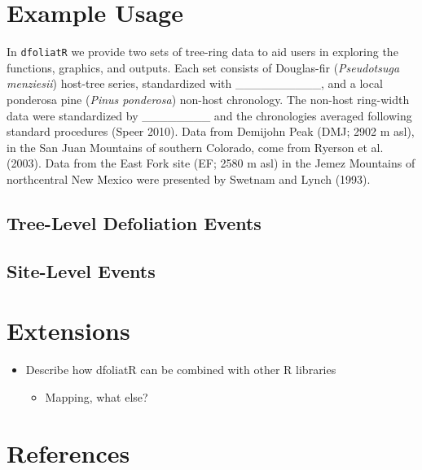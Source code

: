 \documentclass[review]{elsarticle} %
\providecommand{\tightlist}{%
  \setlength{\itemsep}{0pt}\setlength{\parskip}{0pt}}
\begin{document}
\hypertarget{example-usage}{%
\section{Example Usage}\label{example-usage}}

In \texttt{dfoliatR} we provide two sets of tree-ring data to aid users
in exploring the functions, graphics, and outputs. Each set consists of
Douglas-fir (\emph{Pseudotsuga menziesii}) host-tree series,
standardized with \_\_\_\_\_\_\_\_\_\_, and a local ponderosa pine
(\emph{Pinus ponderosa}) non-host chronology. The non-host ring-width
data were standardized by \_\_\_\_\_\_\_\_ and the chronologies averaged
following standard procedures (Speer 2010). Data from Demijohn Peak
(DMJ; 2902 m asl), in the San Juan Mountains of southern Colorado, come
from Ryerson et al. (2003). Data from the East Fork site (EF; 2580 m
asl) in the Jemez Mountains of northcentral New Mexico were presented by
Swetnam and Lynch (1993).

\hypertarget{tree-level-defoliation-events}{%
\subsection{Tree-Level Defoliation
Events}\label{tree-level-defoliation-events}}

\hypertarget{site-level-events}{%
\subsection{Site-Level Events}\label{site-level-events}}

\hypertarget{extensions}{%
\section{Extensions}\label{extensions}}

\begin{itemize}
\tightlist
\item
  Describe how dfoliatR can be combined with other R libraries

  \begin{itemize}
  \tightlist
  \item
    Mapping, what else?
  \end{itemize}
\end{itemize}

\hypertarget{references}{%
\section*{References}\label{references}}
\end{document}
